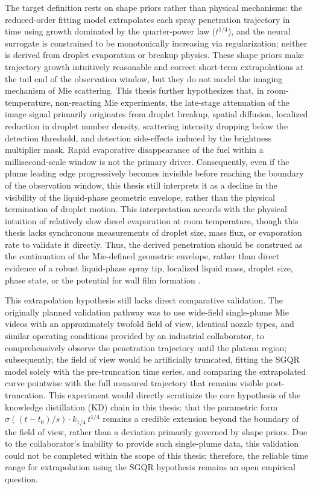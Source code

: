 The target definition rests on shape priors rather than physical mechanisms: the reduced-order fitting model extrapolates each spray penetration trajectory in time using growth dominated by the quarter-power law ($t^{1/4}$), and the neural surrogate is constrained to be monotonically increasing via regularization; neither is derived from droplet evaporation or breakup physics.
These shape priors make trajectory growth intuitively reasonable and correct short-term extrapolations at the tail end of the observation window, but they do not model the imaging mechanism of Mie scattering.
This thesis further hypothesizes that, in room-temperature, non-reacting Mie experiments, the late-stage attenuation of the image signal primarily originates from droplet breakup, spatial diffusion, localized reduction in droplet number density, scattering intensity dropping below the detection threshold, and detection side-effects induced by the brightness multiplier mask. Rapid evaporative disappearance of the fuel within a millisecond-scale window is not the primary driver.
Consequently, even if the plume leading edge progressively becomes invisible before reaching the boundary of the observation window, this thesis still interprets it as a decline in the visibility of the liquid-phase geometric envelope, rather than the physical termination of droplet motion.
This interpretation accords with the physical intuition of relatively slow diesel evaporation at room temperature, though this thesis lacks synchronous measurements of droplet size, mass flux, or evaporation rate to validate it directly.
Thus, the derived penetration should be construed as the continuation of the Mie-defined geometric envelope, rather than direct evidence of a robust liquid-phase spray tip, localized liquid mass, droplet size, phase state, or the potential for wall film formation \cite{ecn_liquid_penetration,ecn_liquid_penetration_accessory}.

This extrapolation hypothesis still lacks direct comparative validation.
The originally planned validation pathway was to use wide-field single-plume Mie videos with an approximately twofold field of view, identical nozzle types, and similar operating conditions provided by an industrial collaborator, to comprehensively observe the penetration trajectory until the plateau region;
subsequently, the field of view would be artificially truncated, fitting the \(\mathrm{SGQR}\) model solely with the pre-truncation time series, and comparing the extrapolated curve pointwise with the full measured trajectory that remains visible post-truncation.
This experiment would directly scrutinize the core hypothesis of the knowledge distillation (KD) chain in this thesis: that the parametric form \(\sigma\!\left((t-t_0)/s\right)\cdot k_{1/4}\,t^{1/4}\) remains a credible extension beyond the boundary of the field of view, rather than a deviation primarily governed by shape priors.
Due to the collaborator's inability to provide such single-plume data, this validation could not be completed within the scope of this thesis; therefore, the reliable time range for extrapolation using the \(\mathrm{SGQR}\) hypothesis remains an open empirical question.

